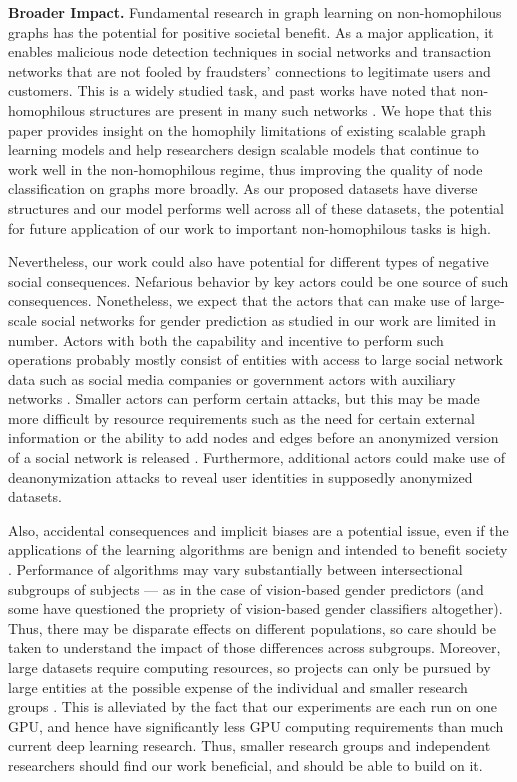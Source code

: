 \documentclass{article}
\newcommand{\myparagraph}[1]{\noindent \textbf{#1}}
\begin{document}
\myparagraph{Broader Impact.} 
Fundamental research in graph learning on non-homophilous graphs has the potential for positive societal benefit. As a major application, it enables malicious node detection techniques in social networks and transaction networks that are not fooled by fraudsters’ connections to legitimate users and customers. This is a widely studied task, and past works have noted that non-homophilous structures are present in many such networks \cite{breuer2020friend, gatterbauer2014semi, pandit2007netprobe}. We hope that this paper provides insight on the homophily limitations of existing scalable graph learning models and help researchers design scalable models that continue to work well in the non-homophilous regime, thus improving the quality of node classification on graphs more broadly. As our proposed datasets have diverse structures and our model performs well across all of these datasets, the potential for future application of our work to important non-homophilous tasks is high.

Nevertheless, our work could also have potential for different types of negative social consequences. Nefarious behavior by key actors could be one source of such consequences. 
Nonetheless, we expect that the actors that can make use of large-scale social networks for gender prediction as studied in our work are limited in number. Actors with both the capability and incentive to perform such operations probably mostly consist of entities with access to large social network data such as social media companies or government actors with auxiliary networks \cite{Narayanan2009}. 
Smaller actors can perform certain attacks, but this may be made more difficult by resource requirements such as the need for certain external information \cite{Narayanan2009} or the ability to add nodes and edges before an anonymized version of a social network is released \cite{Backstrom2007WhereforeAT}. Furthermore, additional actors could make use of deanonymization attacks \cite{Hay2008Resisting, Narayanan2008, Narayanan2009} to reveal user identities in supposedly anonymized datasets.

Also, accidental consequences and implicit biases are a potential issue, even if the applications of the learning algorithms are benign and intended to benefit society \cite{mehrabi2019survey}. Performance of algorithms may vary substantially between intersectional subgroups of subjects — as in the case of vision-based gender predictors \cite{buolamwini18gender} (and some have questioned the propriety of vision-based gender classifiers altogether). Thus, there may be disparate effects on different populations, so care should be taken to understand the impact of those differences across subgroups. Moreover, large datasets require computing resources, so projects can only be pursued by large entities at the possible expense of the individual and smaller research groups \cite{birhane2021values}. This is alleviated by the fact that our experiments are each run on one GPU, and hence have significantly less GPU computing requirements than much current deep learning research. Thus, smaller research groups and independent researchers should find our work beneficial, and should be able to build on it.
\end{document}
